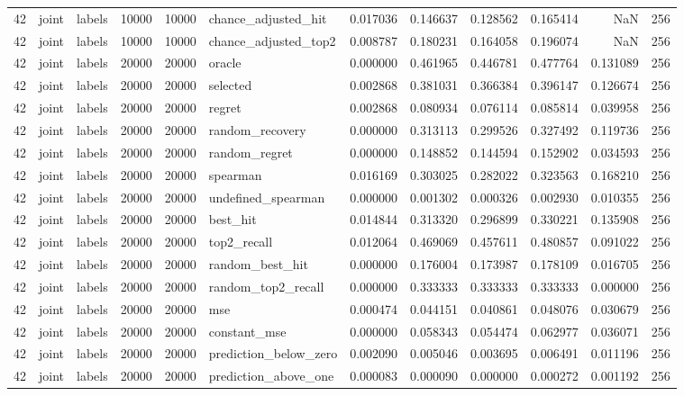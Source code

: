 \begin{tabular}{rllrrlrrrrrr}
42 & joint & labels & 10000 & 10000 & chance_adjusted_hit & 0.017036 & 0.146637 & 0.128562 & 0.165414 & NaN & 256 \\
42 & joint & labels & 10000 & 10000 & chance_adjusted_top2 & 0.008787 & 0.180231 & 0.164058 & 0.196074 & NaN & 256 \\
42 & joint & labels & 20000 & 20000 & oracle & 0.000000 & 0.461965 & 0.446781 & 0.477764 & 0.131089 & 256 \\
42 & joint & labels & 20000 & 20000 & selected & 0.002868 & 0.381031 & 0.366384 & 0.396147 & 0.126674 & 256 \\
42 & joint & labels & 20000 & 20000 & regret & 0.002868 & 0.080934 & 0.076114 & 0.085814 & 0.039958 & 256 \\
42 & joint & labels & 20000 & 20000 & random_recovery & 0.000000 & 0.313113 & 0.299526 & 0.327492 & 0.119736 & 256 \\
42 & joint & labels & 20000 & 20000 & random_regret & 0.000000 & 0.148852 & 0.144594 & 0.152902 & 0.034593 & 256 \\
42 & joint & labels & 20000 & 20000 & spearman & 0.016169 & 0.303025 & 0.282022 & 0.323563 & 0.168210 & 256 \\
42 & joint & labels & 20000 & 20000 & undefined_spearman & 0.000000 & 0.001302 & 0.000326 & 0.002930 & 0.010355 & 256 \\
42 & joint & labels & 20000 & 20000 & best_hit & 0.014844 & 0.313320 & 0.296899 & 0.330221 & 0.135908 & 256 \\
42 & joint & labels & 20000 & 20000 & top2_recall & 0.012064 & 0.469069 & 0.457611 & 0.480857 & 0.091022 & 256 \\
42 & joint & labels & 20000 & 20000 & random_best_hit & 0.000000 & 0.176004 & 0.173987 & 0.178109 & 0.016705 & 256 \\
42 & joint & labels & 20000 & 20000 & random_top2_recall & 0.000000 & 0.333333 & 0.333333 & 0.333333 & 0.000000 & 256 \\
42 & joint & labels & 20000 & 20000 & mse & 0.000474 & 0.044151 & 0.040861 & 0.048076 & 0.030679 & 256 \\
42 & joint & labels & 20000 & 20000 & constant_mse & 0.000000 & 0.058343 & 0.054474 & 0.062977 & 0.036071 & 256 \\
42 & joint & labels & 20000 & 20000 & prediction_below_zero & 0.002090 & 0.005046 & 0.003695 & 0.006491 & 0.011196 & 256 \\
42 & joint & labels & 20000 & 20000 & prediction_above_one & 0.000083 & 0.000090 & 0.000000 & 0.000272 & 0.001192 & 256 \\

\end{tabular}
